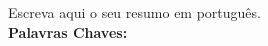 \begin{thesisresumo}

Escreva aqui o seu resumo em português.\\

\textbf{Palavras Chaves:} \ppgmpalavraschave

\end{thesisresumo}
